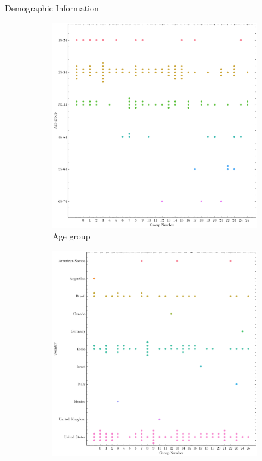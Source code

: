 

\begin{frame}{Demographic Information}

    \begin{figure}
\begin{subfigure}{.3\textwidth}
  \centering
  \includegraphics[width=.8\linewidth]{Images/Age_group.pdf}
  \caption{Age group}
  \label{fig:persona_age_group}
\end{subfigure}%
\begin{subfigure}{.3\textwidth}
  \centering
  \includegraphics[width=.8\linewidth]{Images/Country.pdf}

\end{subfigure}
\end{figure}
\end{frame}
